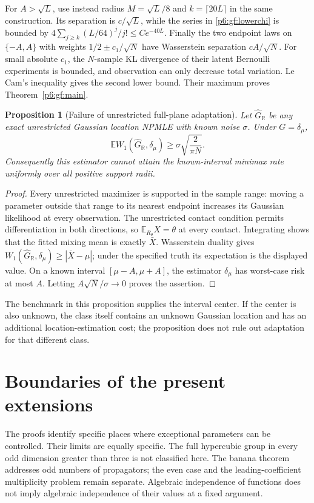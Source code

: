 \documentclass[11pt,a4paper]{article}
\newtheorem{proposition}[theorem]{Proposition}
\theoremstyle{definition}
\theoremstyle{remark}
\numberwithin{equation}{section}
\begin{document}
For $A>\sqrt L$, use instead radius $M=\sqrt L/8$ and
$k=\lceil20L\rceil$ in the same construction.
Its separation is $c/\sqrt L$, while the series in
\eqref{p6:gf:lowerchi} is bounded by
$4\sum_{j\ge k}(L/64)^j/j!\le Ce^{-40L}$.
Finally the two endpoint laws on $\{-A,A\}$ with weights
$1/2\pm c_1/\sqrt N$ have Wasserstein separation $cA/\sqrt N$.
For small absolute $c_1$, the $N$-sample KL divergence of their
latent Bernoulli experiments is bounded, and observation can only
decrease total variation.  Le Cam's inequality gives the second
lower bound.  Their maximum proves Theorem~\ref{p6:gf:main}.

\begin{proposition}[Failure of unrestricted full-plane adaptation]
\label{p6:gf:nonadapt}
Let $\widehat G_{\mathbb R}$ be any exact unrestricted Gaussian
location NPMLE with known noise $\sigma$.  Under $G=\delta_\mu$,
\[
 \mathbb E W_1(\widehat G_{\mathbb R},\delta_\mu)
                 \ge\sigma\sqrt{\frac{2}{\pi N}}.
\]
Consequently this estimator cannot attain the known-interval minimax
rate uniformly over all positive support radii.
\end{proposition}
\begin{proof}
Every unrestricted maximizer is supported in the sample range:
moving a parameter outside that range to its nearest endpoint
increases its Gaussian likelihood at every observation.
The unrestricted contact condition permits differentiation in both
directions, so $\mathbb E_{R_\theta}X=\theta$ at every contact.
Integrating shows that the fitted mixing mean is exactly $\bar X$.
Wasserstein duality gives
$W_1(\widehat G_{\mathbb R},\delta_\mu)\ge|\bar X-\mu|$;
under the specified truth its expectation is the displayed value.
On a known interval $[\mu-A,\mu+A]$, the estimator $\delta_\mu$
has worst-case risk at most $A$.
Letting $A\sqrt N/\sigma\to0$ proves the assertion.
\end{proof}
The benchmark in this proposition supplies the interval center.
If the center is also unknown, the class itself contains an unknown
Gaussian location and has an additional location-estimation cost;
the proposition does not rule out adaptation for that different class.


\clearpage

\section{Boundaries of the present extensions}

The proofs identify specific places where exceptional parameters
can be controlled. Their limits are equally specific. The full
hypercubic group in every odd dimension greater than three is not
classified here. The banana theorem addresses odd numbers of
propagators; the even case and the leading-coefficient multiplicity
problem remain separate. Algebraic independence of functions does
not imply algebraic independence of their values at a fixed argument.
\end{document}
